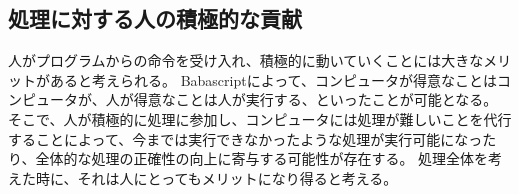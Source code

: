 \documentclass[twoside]{wiss}
\begin{document}
\subsection{処理に対する人の積極的な貢献}

人がプログラムからの命令を受け入れ、積極的に動いていくことには大きなメリットがあると考えられる。
Babascriptによって、コンピュータが得意なことはコンピュータが、人が得意なことは人が実行する、といったことが可能となる。
そこで、人が積極的に処理に参加し、コンピュータには処理が難しいことを代行することによって、今までは実行できなかったような処理が実行可能になったり、全体的な処理の正確性の向上に寄与する可能性が存在する。
処理全体を考えた時に、それは人にとってもメリットになり得ると考える。






\end{document}
